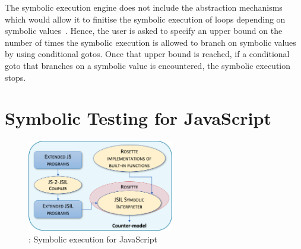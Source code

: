 
 The \jsil symbolic execution engine does not 
include the abstraction mechanisms which would allow it to finitise the symbolic 
execution of loops depending on symbolic values~\cite{abstract:symbolic:exec}. 
Hence, the user is asked to specify an upper bound on the number of times
the symbolic execution is allowed to branch on symbolic values by using
conditional gotos. 
Once that upper bound is reached, if a conditional goto that branches 
on a symbolic value is encountered, the symbolic execution stops.  

%
 


\section{Symbolic Testing for JavaScript}
\label{sec:sym:exec:js}

\begin{figure}
\vspace*{-0.4cm}
\centering
\includegraphics[width=0.57\textwidth]{figures/jilette_blue.png}
\vspace*{-0.2cm}
\caption{\jilette: Symbolic execution for JavaScript}
\vspace*{-0.3cm}
\label{fig:jilette:diagram}
\end{figure}

